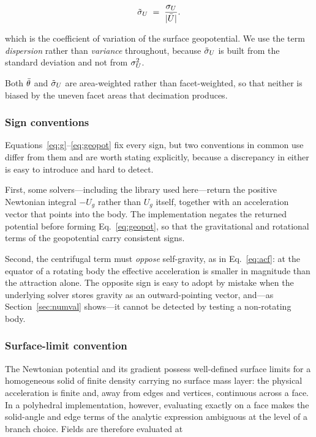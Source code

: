 \begin{equation}
\tilde{\sigma}_{U} \;=\; \frac{\sigma_{U}}{\lvert \bar{U} \rvert}.
\label{eq:potvarn}
\end{equation}

which is the coefficient of variation of the surface geopotential. We use the
term \emph{dispersion} rather than \emph{variance} throughout, because
$\tilde{\sigma}_{U}$ is built from the standard deviation and not from
$\sigma_{U}^{2}$.

Both $\bar{\theta}$ and $\tilde{\sigma}_{U}$ are area-weighted rather than facet-weighted,
so that neither is biased by the uneven facet areas that decimation produces.

\subsubsection{Sign conventions}
\label{sec:signs}

Equations~\eqref{eq:g}--\eqref{eq:geopot} fix every sign, but two conventions
in common use differ from them and are worth stating explicitly, because a
discrepancy in either is easy to introduce and hard to detect.

First, some solvers---including the library used here---return the positive
Newtonian integral $-U_{g}$ rather than $U_{g}$ itself, together with an
acceleration vector that points into the body. The implementation negates the
returned potential before forming Eq.~\eqref{eq:geopot}, so that the
gravitational and rotational terms of the geopotential carry consistent signs.

Second, the centrifugal term must \emph{oppose} self-gravity, as in
Eq.~\eqref{eq:acf}: at the equator of a rotating body the effective
acceleration is smaller in magnitude than the attraction alone. The opposite
sign is easy to adopt by mistake when the underlying solver stores gravity as
an outward-pointing vector, and---as Section~\ref{sec:numval} shows---it cannot
be detected by testing a non-rotating body.

\subsubsection{Surface-limit convention}
\label{sec:surflimit}

The Newtonian potential and its gradient possess well-defined surface limits
for a homogeneous solid of finite density carrying no surface mass layer: the
physical acceleration is finite and, away from edges and vertices, continuous
across a face. In a polyhedral implementation, however, evaluating exactly on a
face makes the solid-angle and edge terms of the analytic expression ambiguous
at the level of a branch choice. Fields are therefore evaluated at

